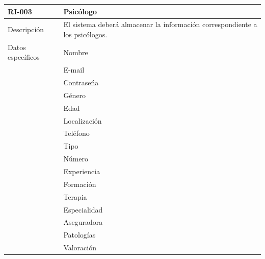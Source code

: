 \begin{table}[htpb]
\centering
\begin{tabularx}{\textwidth}{|l|X|}
\hline
RI-003             & Psicólogo                                                                    \\ \hline
Descripción        & El sistema deberá almacenar la información correspondiente a los psicólogos. \\ \hline
Datos específicos  & Nombre                                                                       \\ \hline
\multirow{18}{*}{} & E-mail                                                                       \\ 
                   & Contraseńa                                                                   \\  
                   & Género                                                                       \\ 
                   & Edad                                                                         \\  
                   & Localización                                                                 \\ 
                   & Teléfono                                                                     \\ 
                   & Tipo                                                                         \\ 
                   & Número                                                                       \\  
                   & Experiencia                                                                  \\ 
                   & Formación                                                                    \\ 
                   & Terapia                                                                      \\ 
                   & Especialidad                                                                 \\ 
                   & Aseguradora                                                                  \\  
                   & Patologías                                                                   \\  
                   & Valoración                                                                   \\ 

\end{tabularx}
\end{table}
